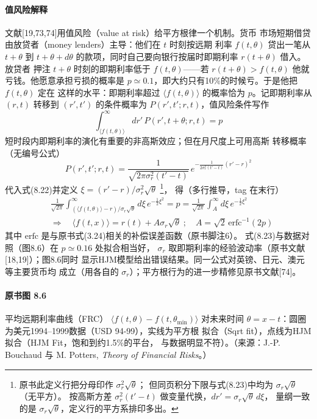 \paragraph{值风险解释}
文献[19,73,74]用值风险（value at risk）给平方根律一个机制。货币
市场短期借贷由放贷者（money lenders）主导：他们在 $t$ 时刻按远期
利率 $f(t,\theta)$ 贷出一笔从 $t+\theta$ 到 $t+\theta+d\theta$
的款项，同时自己要向银行按届时即期利率 $r(t+\theta)$ 借入。放贷者
押注 $t+\theta$ 时刻的即期利率低于 $f(t,\theta)$——若
$r(t+\theta)>f(t,\theta)$ 他就亏钱。他愿意承担亏损的概率是
$p\simeq0.1$，即大约只有10\%的时候亏。于是他把 $f(t,\theta)$ 定在
这样的水平：即期利率超过 $\langle f(t,\theta)\rangle$ 的概率恰为
$p$。记即期利率从 $(r,t)$ 转移到 $(r',t')$ 的条件概率为
$P(r',t';r,t)$，值风险条件写作
\begin{equation*}
\int_{\langle f(t,\theta)\rangle}^{\infty}dr'\,
P(r',t+\theta;r,t)=p
\tag{8.22}
\end{equation*}
短时段内即期利率的演化有重要的非高斯效应；但在月尺度上可用高斯
转移概率（无编号公式）
\begin{equation*}
P(r',t';r,t)=\frac{1}{\sqrt{2\pi\sigma_{r}^{2}(t'-t)}}
\,e^{-\frac{1}{2\sigma_{r}^{2}(t'-t)}(r'-r)^{2}}
\end{equation*}
代入式(8.22)并定义 $\xi=(r'-r)/\sigma_{r}^{2}\sqrt{\theta}$
\footnote{原书此定义行把分母印作 $\sigma_{r}^{2}\sqrt{\theta}$；
但同页积分下限与式(8.23)中均为 $\sigma_{r}\sqrt{\theta}$（无平方）。
按高斯方差 $\sigma_{r}^{2}(t'-t)$ 做变量代换，$dr'=\sigma_r\sqrt{\theta}\,d\xi$，
量纲一致的是 $\sigma_r\sqrt{\theta}$，定义行的平方系排印多出。}，
得（多行推导，tag 在末行）
\begin{align*}
&\frac{1}{\sqrt{2\pi}}\int_{(\langle f(t,\theta)\rangle-r)/\sigma_{r}\sqrt{\theta}}^{\infty}
d\xi\,e^{-\frac{1}{2}\xi^{2}}
=p=\frac{1}{\sqrt{2\pi}}\int_{A}^{\infty}d\xi\,e^{-\frac{1}{2}\xi^{2}}\\
&\Rightarrow\quad\langle f(t,x)\rangle=r(t)+A\sigma_{r}\sqrt{\theta}\;;\quad
A=\sqrt{2}\,\mathrm{erfc}^{-1}(2p)
\tag{8.23}
\end{align*}
其中 $\mathrm{erfc}$ 是与原书式(3.24)相关的补偿误差函数（原书脚注6）。
式(8.23)与数据对照（图8.6）在 $p\simeq0.16$ 处拟合相当好，
$\sigma_{r}$ 取即期利率的经验波动率（原书文献[18,19]）；图8.6同时
显示HJM模型给出错误结果。同一公式对英镑、日元、澳元等主要货币均
成立（用各自的 $\sigma_r$）；平方根行为的进一步精修见原书文献[74]。

\paragraph{原书图 8.6}\quad 平均远期利率曲线（FRC）
$\langle f(t,\theta)-f(t,\theta_{\min})\rangle$ 对未来时间
$\theta=x-t$：圆圈为美元1994--1999数据（USD 94-99），实线为平方根
拟合（Sqrt fit），点线为HJM拟合（HJM Fit，饱和到约1.5\%的平台，
与数据明显不符）。（来源：J.-P. Bouchaud 与 M. Potters,
\textit{Theory of Financial Risks}。）

